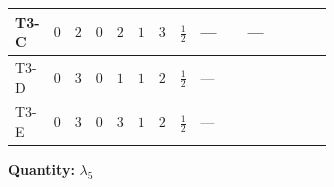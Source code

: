 \documentclass[8pt]{article}
\begin{document}
\begin{landscape}
\begin{longtable}{@{}llcccccc >{\raggedright\arraybackslash}p{0.21\linewidth} >{\raggedright\arraybackslash}p{0.21\linewidth} >{\raggedright\arraybackslash}p{0.21\linewidth}@{}}
\midrule
T3-C & $0$ & $2$ & $0$ & $2$ & $1$ & $3$ & $\frac{1}{2}$ & --- & --- & \scriptsize\adjustbox{max width=\linewidth}{$\begin{gathered} -\frac{9 {g_1}^2 {\lambda_5}}{2}\end{gathered}$} \\
\midrule
T3-D & $0$ & $3$ & $0$ & $1$ & $1$ & $2$ & $\frac{1}{2}$ & --- & \scriptsize\adjustbox{max width=\linewidth}{$\begin{gathered} -\frac{21 {g_2}^2 {\lambda_5}}{2}\end{gathered}$} & \scriptsize\adjustbox{max width=\linewidth}{$\begin{gathered} -\frac{9 {g_1}^2 {\lambda_5}}{2}\end{gathered}$} \\
\midrule
T3-E & $0$ & $3$ & $0$ & $3$ & $1$ & $2$ & $\frac{1}{2}$ & --- & \scriptsize\adjustbox{max width=\linewidth}{$\begin{gathered} -\frac{33 {g_2}^2 {\lambda_5}}{2}\end{gathered}$} & \scriptsize\adjustbox{max width=\linewidth}{$\begin{gathered} -\frac{9 {g_1}^2 {\lambda_5}}{2}\end{gathered}$} \\
\midrule
\bottomrule
\end{longtable}
\clearpage
\noindent\textbf{Quantity: }$\lambda_5$\par\smallskip

\end{landscape}
\end{document}
